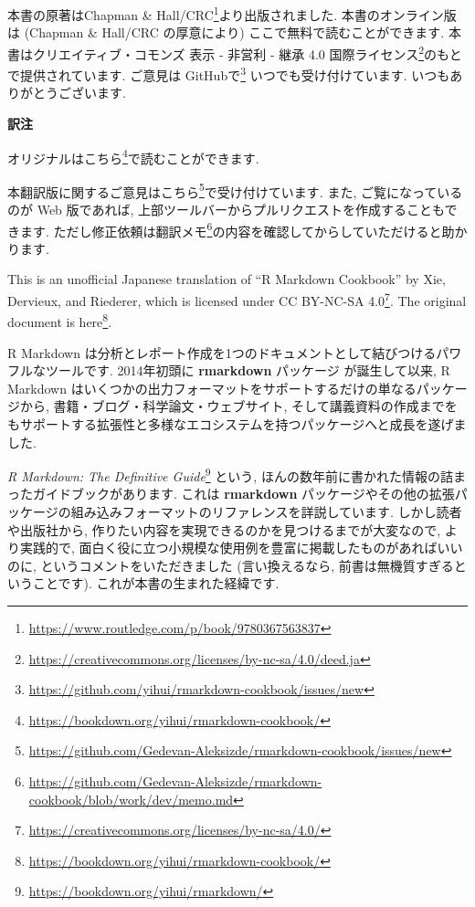 \documentclass[
  11pt,
  lualatex,
  ja=standard]{bxjsreport}
\newenvironment{infobox}[1]{\begin{itemize}\renewcommand{\labelitemi}{\raisebox{-.7\height}[0pt][0pt]{%
  {\setkeys{Gin}{width=3em,keepaspectratio}\texttt{[image: \_latex/\_img/\#1]}}}}
  \setlength{\fboxsep}{1em}
  \begin{greyblock}
  \item
  }{\end{greyblock}\end{itemize}
}
\renewcommand{\href}[2]{#2\footnote{\url{#1}}}
\begin{document}
\begin{infobox}{caution}
本書の原著は\href{https://www.routledge.com/p/book/9780367563837}{Chapman \& Hall/CRC}より出版されました. 本書のオンライン版は (Chapman \& Hall/CRC の厚意により) ここで無料で読むことができます. 本書は\href{https://creativecommons.org/licenses/by-nc-sa/4.0/deed.ja}{クリエイティブ・コモンズ 表示 - 非営利 - 継承 4.0 国際ライセンス}のもとで提供されています. ご意見は \href{https://github.com/yihui/rmarkdown-cookbook/issues/new}{GitHubで} いつでも受け付けています. いつもありがとうございます.

\begin{center}
\textbf{訳注}

\end{center}

オリジナルは\href{https://bookdown.org/yihui/rmarkdown-cookbook/}{こちら}で読むことができます.

本翻訳版に関するご意見は\href{https://github.com/Gedevan-Aleksizde/rmarkdown-cookbook/issues/new}{こちら}で受け付けています. また, ご覧になっているのが Web 版であれば, 上部ツールバーからプルリクエストを作成することもできます. ただし修正依頼は\href{https://github.com/Gedevan-Aleksizde/rmarkdown-cookbook/blob/work/dev/memo.md}{翻訳メモ}の内容を確認してからしていただけると助かります.

This is an unofficial Japanese translation of ``R Markdown Cookbook'' by Xie, Dervieux, and Riederer, which is licensed under \href{https://creativecommons.org/licenses/by-nc-sa/4.0/}{CC BY-NC-SA 4.0}. The original document is \href{https://bookdown.org/yihui/rmarkdown-cookbook/}{here}.

\end{infobox}

R Markdown は分析とレポート作成を1つのドキュメントとして結びつけるパワフルなツールです. 2014年初頭に \textbf{rmarkdown} パッケージ \autocite{R-rmarkdown} が誕生して以来, R Markdown はいくつかの出力フォーマットをサポートするだけの単なるパッケージから, 書籍・ブログ・科学論文・ウェブサイト, そして講義資料の作成までをもサポートする拡張性と多様なエコシステムを持つパッケージへと成長を遂げました.

\href{https://bookdown.org/yihui/rmarkdown/}{\emph{R Markdown: The Definitive Guide}} \autocite{rmarkdown2018} という, ほんの数年前に書かれた情報の詰まったガイドブックがあります. これは \textbf{rmarkdown} パッケージやその他の拡張パッケージの組み込みフォーマットのリファレンスを詳説しています. しかし読者や出版社から, 作りたい内容を実現できるのかを見つけるまでが大変なので, より実践的で, 面白く役に立つ小規模な使用例を豊富に掲載したものがあればいいのに, というコメントをいただきました (言い換えるなら, 前書は無機質すぎるということです). これが本書の生まれた経緯です.
\end{document}
